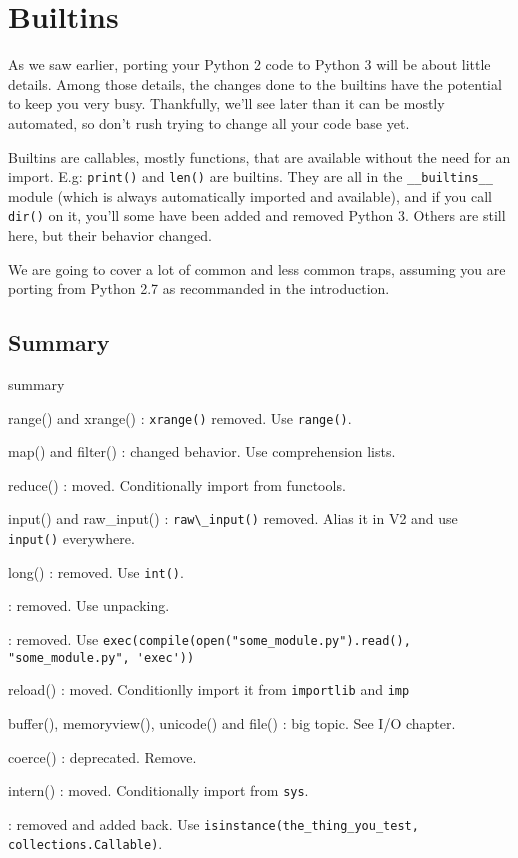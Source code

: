 
\chapter{Builtins}

As we saw earlier, porting your Python 2 code to Python 3 will be about little details. Among those details, the changes done to the builtins have the potential to keep you very busy. Thankfully, we'll see later than it can be mostly automated, so don't rush trying to change all your code base yet.

Builtins are \glspl{callable}, mostly functions, that are available without the need for an import. E.g: \lstinline{print()} and \lstinline{len()} are builtins. They are all in the \lstinline{__builtins__} module (which is always automatically imported and available), and if you call \lstinline{dir()} on it, you'll some have been added and removed Python 3. Others are still here, but their behavior changed.

We are going to cover a lot of common and less common traps, assuming you are porting from Python 2.7 as recommanded in the introduction.

\section{Summary}

\begin{labeling}{summary}
\item [range() and xrange()]: \lstinline{xrange()} removed. Use \lstinline{range()}.
\item [map() and filter()]: changed behavior. Use comprehension lists.
\item [reduce()]: moved. Conditionally import from functools.
\item [input() and raw\_input()]: \lstinline{raw\_input()} removed. Alias it in V2 and use \lstinline{input()} everywhere.
\item [long()]: removed. Use \lstinline{int()}.
\item [apply()]: removed. Use unpacking.
\item [execfile()]: removed. Use \lstinline{exec(compile(open("some_module.py").read(), "some_module.py", 'exec'))}
\item [reload()]: moved. Conditionlly import it from \lstinline{importlib} and \lstinline{imp}
\item [buffer(), memoryview(), unicode() and file()]: big topic. See I/O chapter.
\item [coerce()]: deprecated. Remove.
\item [intern()]: moved. Conditionally import from \lstinline{sys}.
\item [callable()]: removed and added back. Use \lstinline{isinstance(the_thing_you_test, collections.Callable)}.
\end{labeling}

